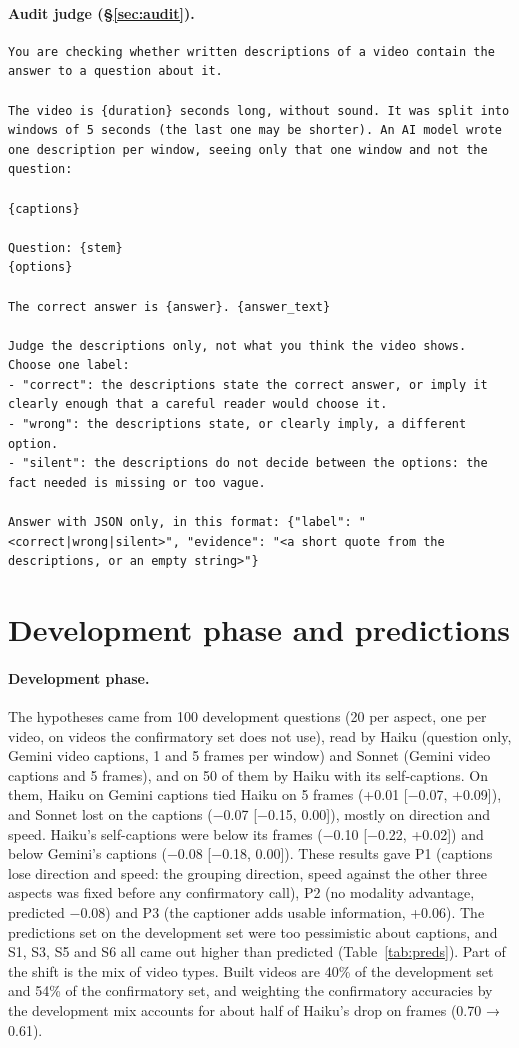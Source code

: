 \documentclass[11pt]{article}
\begin{document}
\paragraph{Audit judge (\S\ref{sec:audit}).}
\begin{lstlisting}
You are checking whether written descriptions of a video contain the answer to a question about it.

The video is {duration} seconds long, without sound. It was split into windows of 5 seconds (the last one may be shorter). An AI model wrote one description per window, seeing only that one window and not the question:

{captions}

Question: {stem}
{options}

The correct answer is {answer}. {answer_text}

Judge the descriptions only, not what you think the video shows. Choose one label:
- "correct": the descriptions state the correct answer, or imply it clearly enough that a careful reader would choose it.
- "wrong": the descriptions state, or clearly imply, a different option.
- "silent": the descriptions do not decide between the options: the fact needed is missing or too vague.

Answer with JSON only, in this format: {"label": "<correct|wrong|silent>", "evidence": "<a short quote from the descriptions, or an empty string>"}
\end{lstlisting}

\section{Development phase and predictions}
\label{app:dev}

\paragraph{Development phase.} The hypotheses came from 100 development questions (20 per aspect, one per video, on videos the confirmatory set does not use), read by Haiku (question only, Gemini video captions, 1 and 5 frames per window) and Sonnet (Gemini video captions and 5 frames), and on 50 of them by Haiku with its self-captions. On them, Haiku on Gemini captions tied Haiku on 5 frames (+0.01 [−0.07, +0.09]), and Sonnet lost on the captions (−0.07 [−0.15, 0.00]), mostly on direction and speed. Haiku's self-captions were below its frames (−0.10 [−0.22, +0.02]) and below Gemini's captions (−0.08 [−0.18, 0.00]). These results gave P1 (captions lose direction and speed: the grouping {direction, speed} against the other three aspects was fixed before any confirmatory call), P2 (no modality advantage, predicted −0.08) and P3 (the captioner adds usable information, +0.06). The predictions set on the development set were too pessimistic about captions, and S1, S3, S5 and S6 all came out higher than predicted (Table~\ref{tab:preds}). Part of the shift is the mix of video types. Built videos are 40\% of the development set and 54\% of the confirmatory set, and weighting the confirmatory accuracies by the development mix accounts for about half of Haiku's drop on frames (0.70 → 0.61).
\end{document}
